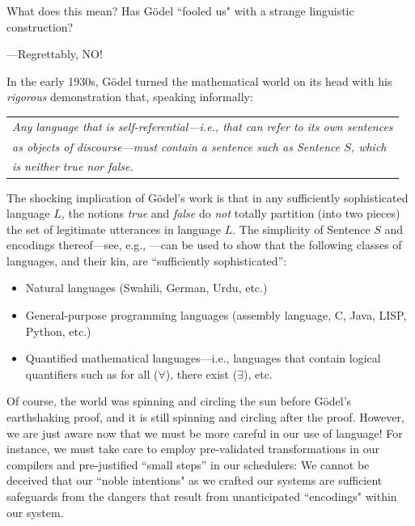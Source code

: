 \bigskip

\noindent
What does this mean?  Has G\"{o}del ``fooled us" with a strange linguistic construction?

\smallskip

\noindent
---Regrettably, NO!

\medskip

\noindent
In the early 1930s, G\"{o}del turned the mathematical world on its head with his {\em rigorous }demonstration that, speaking informally:

\smallskip

\begin{tabular}{l}
{\em Any language that is {\em self-referential}---i.e., that can refer to its own sentences} \\
{\em as objects of discourse---must contain a sentence such as Sentence $S$, which} \\
{\em is neither true nor false.}  \cite{Goedel31}
\end{tabular}

\bigskip

The shocking implication of G\"{o}del's work is that in any sufficiently sophisticated language $L$, the notions {\it true} and {\it false} do {\em not} totally partition (into two pieces) the set of legitimate utterances in language $L$.  The simplicity of Sentence $S$ and encodings thereof---see, e.g., \cite{Rosenberg09}---can be used to show that the following classes of languages, and their kin, are
``sufficiently sophisticated'':
\begin{itemize}
\item
Natural languages (Swahili, German, Urdu, etc.)
\medskip\item
General-purpose programming languages (assembly language, C, Java, LISP, Python, etc.)
\medskip\item
Quantified mathematical languages---i.e., languages that contain logical quantifiers such as {\sc for all} ($\forall$), {\sc there exist} ($\exists$), etc.
\end{itemize}

Of course, the world was spinning and circling the sun before G\"{o}del's earthshaking proof, and it is still spinning and circling after the proof.  However, we are just aware now that we must be more careful in our use of language!  For instance, we must take care to employ pre-validated transformations in our compilers and pre-justified ``small steps'' in our schedulers: We cannot be deceived that our ``noble intentions" as we crafted our systems are sufficient safeguards from the dangers that result from unanticipated ``encodings" within our system.



